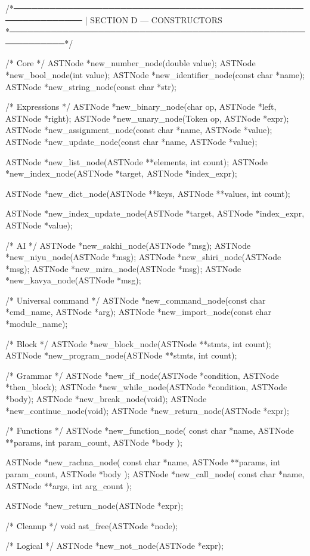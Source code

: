 \documentclass{article}
\begin{document}
/*──────────────────────────────────────────────────────────────
 |  SECTION D — CONSTRUCTORS
 *────────────────────────────────────────────────────────────*/

/* Core */
ASTNode *new_number_node(double value);
ASTNode *new_bool_node(int value);
ASTNode *new_identifier_node(const char *name);
ASTNode *new_string_node(const char *str);

/* Expressions */
ASTNode *new_binary_node(char op, ASTNode *left, ASTNode *right);
ASTNode *new_unary_node(Token op, ASTNode *expr);
ASTNode *new_assignment_node(const char *name, ASTNode *value);
ASTNode *new_update_node(const char *name, ASTNode *value);

ASTNode *new_list_node(ASTNode **elements, int count);
ASTNode *new_index_node(ASTNode *target, ASTNode *index_expr);

ASTNode *new_dict_node(ASTNode **keys, ASTNode **values, int count);

ASTNode *new_index_update_node(ASTNode *target, ASTNode *index_expr, ASTNode *value);

/* AI */
ASTNode *new_sakhi_node(ASTNode *msg);
ASTNode *new_niyu_node(ASTNode *msg);
ASTNode *new_shiri_node(ASTNode *msg);
ASTNode *new_mira_node(ASTNode *msg);
ASTNode *new_kavya_node(ASTNode *msg);

/* Universal command */
ASTNode *new_command_node(const char *cmd_name, ASTNode *arg);
ASTNode *new_import_node(const char *module_name);

/* Block */
ASTNode *new_block_node(ASTNode **stmts, int count);
ASTNode *new_program_node(ASTNode **stmts, int count);

/* Grammar */
ASTNode *new_if_node(ASTNode *condition, ASTNode *then_block);
ASTNode *new_while_node(ASTNode *condition, ASTNode *body);
ASTNode *new_break_node(void);
ASTNode *new_continue_node(void);
ASTNode *new_return_node(ASTNode *expr);

/* Functions */
ASTNode *new_function_node(
    const char *name,
    ASTNode **params,
    int param_count,
    ASTNode *body
);

ASTNode *new_rachna_node(
    const char *name,
    ASTNode **params,
    int param_count,
    ASTNode *body
);
ASTNode *new_call_node(
    const char *name,
    ASTNode **args,
    int arg_count
);

ASTNode *new_return_node(ASTNode *expr);

/* Cleanup */
void ast_free(ASTNode *node);

/* Logical */
ASTNode *new_not_node(ASTNode *expr);
\end{document}
